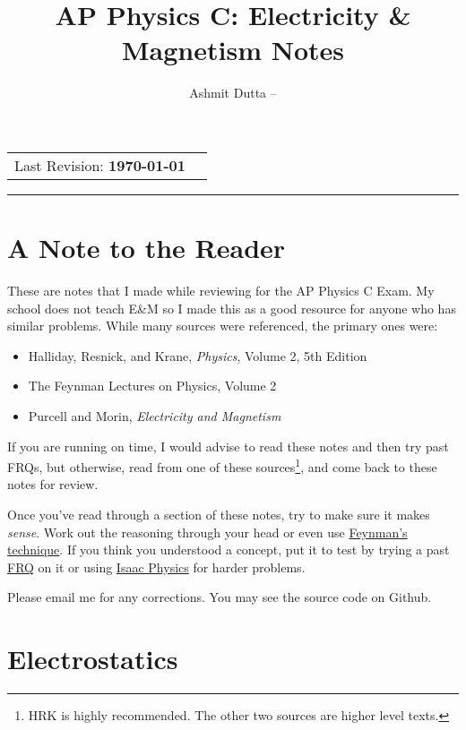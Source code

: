 \documentclass[12pt]{article}
\title{\bf AP Physics C: Electricity \& Magnetism Notes}
\author{Ashmit Dutta -- \email{\texttt{ashmit.dutta105@gmail.com}}}
\date{}
\begin{document}
  \maketitle
  \begin{center}
  \vspace{-0.3in}
  \begin{tabular}{rl}
  Last Revision: \textbf{\today}
  \end{tabular}
  \end{center}
  \noindent 
  \rule{\linewidth}{0.4pt}
  \tableofcontents
  \newpage 
  \section{A Note to the Reader}
  These are notes that I made while reviewing for the AP Physics C Exam. My school does not teach E\&M so I made this as a good resource for anyone who has similar problems. While many sources were referenced, the primary ones were:
\begin{itemize}
    \item Halliday, Resnick, and Krane, \textit{Physics}, Volume 2, 5th Edition
    \item The Feynman Lectures on Physics, Volume 2
    \item Purcell and Morin, \textit{Electricity and Magnetism}
\end{itemize}
If you are running on time, I would advise to read these notes and then try past FRQs, but otherwise, read from one of these sources\footnote{HRK is highly recommended. The other two sources are higher level texts.}, and come back to these notes for review. 

Once you've read through a section of these notes, try to make sure it makes \textit{sense}. Work out the reasoning through your head or even use \href{https://blog.doist.com/feynman-technique/#:~:text=His%20philosophies%20make%20up%20the%20Feynman%20Technique%3A%201,4%20Simplify%20your%20explanations%20and%20create%20analogies.%20}{Feynman's technique}. If you think you understood a concept, put it to test by trying a past \href{https://apcentral.collegeboard.org/courses/ap-physics-c-electricity-and-magnetism/exam/past-exam-questions}{FRQ} on it or using \href{https://isaacphysics.org/concepts?stage=all}{Isaac Physics} for harder problems. 

Please email me for any corrections. You may see the source code on Github.
\newpage 
  \section{Electrostatics}
\end{document}
